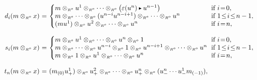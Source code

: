 \documentclass[reqno, a4paper, 10pt]{amsart}
\numberwithin{equation}{section}
\theoremstyle{plain}
\theoremstyle{definition}
\theoremstyle{remark}
\begin{document}
\begin{equation}
\label{adualnightinpyongyang}
\!\!\!
\begin{array}{rcll}
d_i(m \otimes_{{\scriptscriptstyle{{R^{o}}}}} x)  &\!\!\!\! =&\!\!\!\! 
\left\{ \!\!\!
\begin{array}{l}
m \otimes_{{\scriptscriptstyle{{R^{o}}}}} u^1  \otimes_{{\scriptscriptstyle{{R^{o}}}}}   \cdots   \otimes_{{\scriptscriptstyle{{R^{o}}}}}   \big(\varepsilon(u^n) {{\,\raise1pt\hbox{$\scriptscriptstyle{\blacktriangleright}$} \, }} u^{n-1}\big)
\\
m \otimes_{{\scriptscriptstyle{{R^{o}}}}} \cdots \otimes_{{\scriptscriptstyle{{R^{o}}}}}  (u^{n-i} u^{n-i+1})
 \otimes_{{\scriptscriptstyle{{R^{o}}}}}  \cdots \otimes_{{\scriptscriptstyle{{R^{o}}}}} u^n
\\
(mu^1) \otimes_{{\scriptscriptstyle{{R^{o}}}}} u^2  \otimes_{{\scriptscriptstyle{{R^{o}}}}}   \cdots    \otimes_{{\scriptscriptstyle{{R^{o}}}}}  
u^n 
\end{array}\right.  & \!\!\!\!\!\!\!\!\!\! \,  \begin{array}{l} \mbox{if} \ i \!=\! 0, \\ \mbox{if} \ 1
\!  \leq \! i \!\leq\! n-1, \\ \mbox{if} \ i \! = \! n, \end{array} \\
\ \\
s_i(m \otimes_{{\scriptscriptstyle{{R^{o}}}}} x) &\!\!\!\! =&\!\!\!\!  \left\{ \!\!\!
\begin{array}{l} m  \otimes_{{\scriptscriptstyle{{R^{o}}}}}   u^1  
\otimes_{{\scriptscriptstyle{{R^{o}}}}}   \cdots   \otimes_{{\scriptscriptstyle{{R^{o}}}}}
 u^n  \otimes_{{\scriptscriptstyle{{R^{o}}}}} 1
\\
m \otimes_{{\scriptscriptstyle{{R^{o}}}}} \cdots \otimes_{{\scriptscriptstyle{{R^{o}}}}}   u^{n-i} 
\otimes_{{\scriptscriptstyle{{R^{o}}}}}   1  
\otimes_{{\scriptscriptstyle{{R^{o}}}}}   u^{n-i+1}  \otimes_{{\scriptscriptstyle{{R^{o}}}}}
 \cdots  \otimes_{{\scriptscriptstyle{{R^{o}}}}} u^n
\\
m \otimes_{{\scriptscriptstyle{{R^{o}}}}} 1 
\otimes_{{\scriptscriptstyle{{R^{o}}}}} u^1  \otimes_{{\scriptscriptstyle{{R^{o}}}}}   \cdots    \otimes_{{\scriptscriptstyle{{R^{o}}}}}  u^n 
\end{array}\right.   & \!\!\!\!\!\!\!\!\!  \begin{array}{l} 
\mbox{if} \ i\!=\!0, \\ 
\mbox{if} \ 1 \!\leq\! i \!\leq\! n-1, \\  \mbox{if} \ i\! = \!n, \end{array} \\
\ \\
t_n(m \otimes_{{\scriptscriptstyle{{R^{o}}}}} x) 
&\!\!\!\!=&\!\!\!\!
(m_{(0)} u^1_+) \otimes_{{\scriptscriptstyle{{R^{o}}}}} u^2_+ \otimes_{{\scriptscriptstyle{{R^{o}}}}}  \cdots  \otimes_{{\scriptscriptstyle{{R^{o}}}}} u^n_+ \otimes_{{\scriptscriptstyle{{R^{o}}}}} (u^n_- \cdots u^1_- m_{(-1)}),  
& \\
\end{array}
\end{equation}
\end{document}

